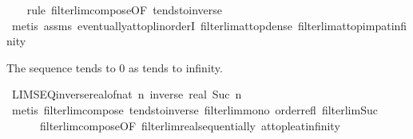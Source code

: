 \begin{isabellebody}
%
\isadelimproof
\ \ %
\endisadelimproof
%
\isatagproof
{}\isamarkupfalse%
\ {\isacharparenleft}{\kern0pt}rule\ filterlim{\isacharunderscore}{\kern0pt}compose{\isacharbrackleft}{\kern0pt}OF\ tendsto{\isacharunderscore}{\kern0pt}inverse{\isacharunderscore}{\kern0pt}{}{\isacharbrackright}{\kern0pt}{\isacharparenright}{\kern0pt}\isanewline
\ \ \isamarkupfalse%
\ {\isacharparenleft}{\kern0pt}metis\ assms\ eventually{\isacharunderscore}{\kern0pt}at{\isacharunderscore}{\kern0pt}top{\isacharunderscore}{\kern0pt}linorderI\ filterlim{\isacharunderscore}{\kern0pt}at{\isacharunderscore}{\kern0pt}top{\isacharunderscore}{\kern0pt}dense\ filterlim{\isacharunderscore}{\kern0pt}at{\isacharunderscore}{\kern0pt}top{\isacharunderscore}{\kern0pt}imp{\isacharunderscore}{\kern0pt}at{\isacharunderscore}{\kern0pt}infinity{\isacharparenright}{\kern0pt}%
\endisatagproof
{\isafoldproof}%
%
\isadelimproof
%
\endisadelimproof
%
\begin{isamarkuptext}%
The sequence  tends to 0 as  tends to infinity.%
\end{isamarkuptext}\isamarkuptrue%
\isamarkupfalse%
\ LIMSEQ{\isacharunderscore}{\kern0pt}inverse{\isacharunderscore}{\kern0pt}real{\isacharunderscore}{\kern0pt}of{\isacharunderscore}{\kern0pt}nat{\isacharcolon}{\kern0pt}\ {\isachardoublequoteopen}{\isacharparenleft}{\kern0pt}{\isasymlambda}n{\isachardot}{\kern0pt}\ inverse\ {\isacharparenleft}{\kern0pt}real\ {\isacharparenleft}{\kern0pt}Suc\ n{\isacharparenright}{\kern0pt}{\isacharparenright}{\kern0pt}{\isacharparenright}{\kern0pt}\ {\isasymlonglonglongrightarrow}\ {}{\isachardoublequoteclose}\isanewline
%
\isadelimproof
\ \ %
\endisadelimproof
%
\isatagproof
{}\isamarkupfalse%
\ {\isacharparenleft}{\kern0pt}metis\ filterlim{\isacharunderscore}{\kern0pt}compose\ tendsto{\isacharunderscore}{\kern0pt}inverse{\isacharunderscore}{\kern0pt}{}\ filterlim{\isacharunderscore}{\kern0pt}mono\ order{\isacharunderscore}{\kern0pt}refl\ filterlim{\isacharunderscore}{\kern0pt}Suc\isanewline
\ \ \ \ \ \ filterlim{\isacharunderscore}{\kern0pt}compose{\isacharbrackleft}{\kern0pt}OF\ filterlim{\isacharunderscore}{\kern0pt}real{\isacharunderscore}{\kern0pt}sequentially{\isacharbrackright}{\kern0pt}\ at{\isacharunderscore}{\kern0pt}top{\isacharunderscore}{\kern0pt}le{\isacharunderscore}{\kern0pt}at{\isacharunderscore}{\kern0pt}infinity{\isacharparenright}{\kern0pt}%

\end{isabellebody}
